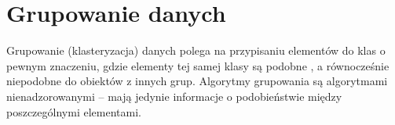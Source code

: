 \documentclass[a4paper,twoside,12pt]{book}
\newtheorem{Definition}{Definicja}
\newtheorem{Example}{Przykład}
\newtheorem{Theorem}{Twierdzenie}
\newcommand{\obcy}[1]{\emph{#1}}
\newcommand{\english}[1]{{\selectlanguage{british}\obcy{#1}}}
\begin{document}

%

%
%

\section{Grupowanie danych}
\label{sec:grupowanie}
 

Grupowanie (klasteryzacja) danych polega na przypisaniu elementów do klas o pewnym znaczeniu, gdzie elementy tej samej klasy są podobne
\cite{bib:fcm-for-optimizing,bib:clustering-alg-survey}, a równocześnie niepodobne do obiektów z innych grup. Algorytmy grupowania są algorytmami nienadzorowanymi -- mają jedynie informacje o podobieństwie między poszczególnymi elementami.
\end{document}
